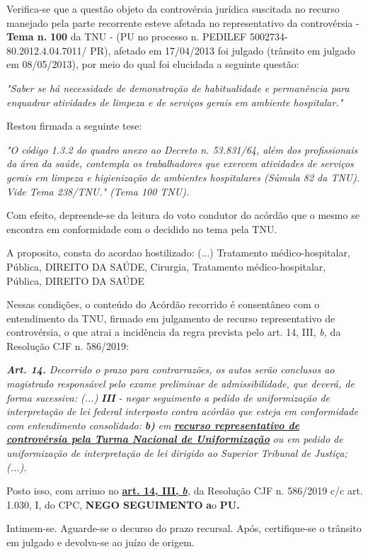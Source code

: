 \documentclass[12pt]{article}
\begin{document}
\justifying
\noindent Verifica-se que a questão objeto da controvérsia jurídica suscitada no recurso manejado pela parte recorrente esteve afetada no representativo da controvérsia - \textbf{Tema n. }\textbf{100} da TNU - (PU no processo n. PEDILEF 5002734-80.2012.4.04.7011/ PR),  afetado em 17/04/2013 foi julgado (trânsito em julgado em 08/05/2013), por meio do qual foi elucidada a seguinte questão:

\noindent \textit{"Saber se há necessidade de demonstração de habitualidade e permanência para enquadrar atividades de limpeza e de serviços gerais em ambiente hospitalar."}

\noindent Restou firmada a seguinte tese:

\noindent \textit{"O código 1.3.2 do quadro anexo ao Decreto n. 53.831/64, além dos profissionais da área da saúde, contempla os trabalhadores que exercem atividades de serviços gerais em limpeza e higienização de ambientes hospitalares (Súmula 82 da TNU). Vide Tema 238/TNU." (Tema 100 TNU).}

\noindent Com efeito, depreende-se da leitura do voto condutor do acórdão que o mesmo se encontra em conformidade com o decidido no  tema pela TNU.

\noindent A proposito, consta do acordao hostilizado: (...) Tratamento médico-hospitalar, Pública, DIREITO DA SAÚDE, Cirurgia, Tratamento médico-hospitalar, Pública, DIREITO DA SAÚDE

\noindent Nessas condições, o conteúdo do Acórdão recorrido é consentâneo com o entendimento da TNU, firmado em julgamento de recurso representativo de controvérsia, o que atrai a incidência da regra prevista pelo art. 14, III, \textit{b,} da Resolução CJF n. 586/2019:

\noindent \textit{\textbf{Art. 14.}}\textit{ Decorrido o prazo para contrarrazões, os autos serão conclusos ao magistrado responsável pelo exame preliminar de admissibilidade, que deverá, de forma sucessiva: (...) }\textit{\textbf{III }}\textit{- negar seguimento a pedido de uniformização de interpretação de lei federal interposto contra acórdão que esteja em conformidade com entendimento consolidado: }\textit{\textbf{b)}}\textit{ em }\uline{\textit{\textbf{recurso representativo de controvérsia pela Turma Nacional de Uniformização}}}\textit{ ou em pedido de uniformização de interpretação de lei dirigido ao Superior Tribunal de Justiça;(...).}

\noindent Posto isso, com arrimo no \uline{\textbf{art. 14, III, }}\uline{\textit{\textbf{b}}}\textit{,} da Resolução CJF n. 586/2019 c/c art. 1.030, I, do CPC, \textbf{NEGO SEGUIMENTO }\textbf{a}o\textbf{ PU}\textbf{.}

\noindent Intimem-se. Aguarde-se o decurso do prazo recursal. Após, certifique-se o trânsito em julgado e devolva-se ao juízo de origem.
\end{document}
